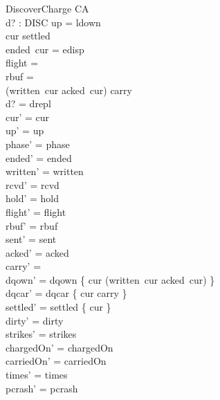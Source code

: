 \documentclass[a4paper,10pt,fleqn]{article}
\begin{document}
\begin{schema}{DiscoverCharge}
  \Delta CA \\
  d? : DISC
\where
  up = ldown \\
  cur \notin settled \\
  ended~cur = edisp \\
  flight = \emptyset \\
  rbuf = \emptyset \\
  (written~cur \setminus acked~cur) \cup carry \neq \emptyset \\
  d? = drepl \\
  cur' = cur \\
  up' = up \\
  phase' = phase \\
  ended' = ended \\
  written' = written \\
  rcvd' = rcvd \\
  hold' = hold \\
  flight' = flight \\
  rbuf' = rbuf \\
  sent' = sent \\
  acked' = acked \\
  carry' = \emptyset \\
  dqown' = dqown \cup \{ cur \mapsto (written~cur \setminus acked~cur) \} \\
  dqcar' = dqcar \cup \{ cur \mapsto carry \} \\
  settled' = settled \cup \{ cur \} \\
  dirty' = dirty \\
  strikes' = strikes \\
  chargedOn' = chargedOn \\
  carriedOn' = carriedOn \\
  times' = times \\
  pcrash' = pcrash
\end{schema}
\end{document}
